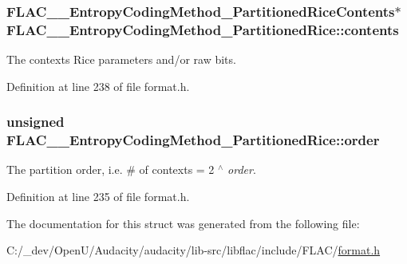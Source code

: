 \subsubsection[{\texorpdfstring{contents}{contents}}]{ {\bf F\+L\+A\+C\+\_\+\+\_\+\+Entropy\+Coding\+Method\+\_\+\+Partitioned\+Rice\+Contents}$\ast$ F\+L\+A\+C\+\_\+\+\_\+\+Entropy\+Coding\+Method\+\_\+\+Partitioned\+Rice\+::contents}\hypertarget{struct_f_l_a_c_____entropy_coding_method___partitioned_rice_a2fbfa1bd5656bf620c0bb9f8ba77f579}{}\label{struct_f_l_a_c_____entropy_coding_method___partitioned_rice_a2fbfa1bd5656bf620c0bb9f8ba77f579}
The context\textquotesingle{}s Rice parameters and/or raw bits. 

Definition at line 238 of file format.\+h.

\subsubsection[{\texorpdfstring{order}{order}}]{\setlength{\rightskip}{0pt plus 5cm}unsigned F\+L\+A\+C\+\_\+\+\_\+\+Entropy\+Coding\+Method\+\_\+\+Partitioned\+Rice\+::order}\hypertarget{struct_f_l_a_c_____entropy_coding_method___partitioned_rice_a1e1c9049e31eab5113c245164b2c694a}{}\label{struct_f_l_a_c_____entropy_coding_method___partitioned_rice_a1e1c9049e31eab5113c245164b2c694a}
The partition order, i.\+e. \# of contexts = 2 $^\wedge$ {\itshape order}. 

Definition at line 235 of file format.\+h.



The documentation for this struct was generated from the following file\+:\begin{DoxyCompactItemize}
\item 
C\+:/\+\_\+dev/\+Open\+U/\+Audacity/audacity/lib-\/src/libflac/include/\+F\+L\+A\+C/\hyperlink{include_2_f_l_a_c_2format_8h}{format.\+h}\end{DoxyCompactItemize}
